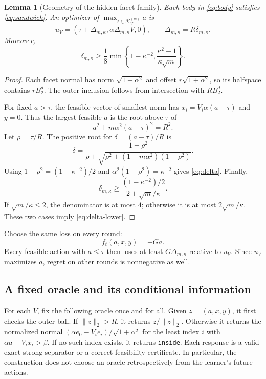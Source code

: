 \documentclass[11pt]{article}
\newcommand{\K}{\mathcal K}
\newcommand{\norm}[1]{\lVert #1\rVert}
\newtheorem{lemma}[lemma]{Lemma}
\theoremstyle{definition}
\begin{document}
\begin{lemma}[Geometry of the hidden-facet family]\label{lem:geometry}
Each body in \eqref{eq:body} satisfies \eqref{eq:sandwich}. An optimizer
of $\max_{z\in\K_V^{(m)}}a$ is
\begin{equation}\label{eq:comparator}
 u_V=(\tau+\Delta_{m,\kappa},\alpha\Delta_{m,\kappa}V,0),
 \qquad \Delta_{m,\kappa}=R\delta_{m,\kappa}.
\end{equation}
Moreover,
\begin{equation}\label{eq:delta-lower}
 \delta_{m,\kappa}\ge\frac18
 \min\left\{1-\kappa^{-2},\frac{\kappa^2-1}{\kappa\sqrt m}\right\}.
\end{equation}
\end{lemma}

\begin{proof}
Each facet normal has norm $\sqrt{1+\alpha^2}$ and offset
$r\sqrt{1+\alpha^2}$, so its halfspace contains $rB_2^d$.
The outer inclusion follows from intersection with $RB_2^d$.

For fixed $a>\tau$, the feasible vector of smallest norm has
$x_i=V_i\alpha(a-\tau)$ and $y=0$. Thus the largest feasible $a$ is the
root above $\tau$ of
\[
 a^2+m\alpha^2(a-\tau)^2=R^2.
\]
Let $\rho=\tau/R$. The positive root for $\delta=(a-\tau)/R$ is
\[
 \delta=\frac{1-\rho^2}
 {\rho+\sqrt{\rho^2+(1+m\alpha^2)(1-\rho^2)}}.
\]
Using $1-\rho^2=(1-\kappa^{-2})/2$ and
$\alpha^2(1-\rho^2)=\kappa^{-2}$ gives \eqref{eq:delta}.
Finally,
\[
 \delta_{m,\kappa}
 \ge\frac{(1-\kappa^{-2})/2}{2+\sqrt m/\kappa}.
\]
If $\sqrt m/\kappa\le2$, the denominator is at most $4$;
otherwise it is at most $2\sqrt m/\kappa$. These two cases imply
\eqref{eq:delta-lower}.
\end{proof}

Choose the same loss on every round:
\begin{equation}\label{eq:fixed-loss}
 f_t(a,x,y)=-Ga.
\end{equation}
Every feasible action with $a\le\tau$ then loses at least
$G\Delta_{m,\kappa}$ relative to $u_V$. Since $u_V$ maximizes $a$, regret
on other rounds is nonnegative as well.

\subsection{A fixed oracle and its conditional information}

For each $V$, fix the following oracle once and for all. Given
$z=(a,x,y)$, it first checks the outer ball. If $\norm{z}_2>R$, it returns
$z/\norm{z}_2$. Otherwise it returns the normalized normal
$(\alpha e_0-V_ie_i)/\sqrt{1+\alpha^2}$ for the least index $i$ with
$\alpha a-V_ix_i>\beta$. If no such index exists, it returns
\texttt{inside}. Each response is a valid exact strong separator or a
correct feasibility certificate. In particular, the construction does not
choose an oracle retrospectively from the learner's future actions.
\end{document}
